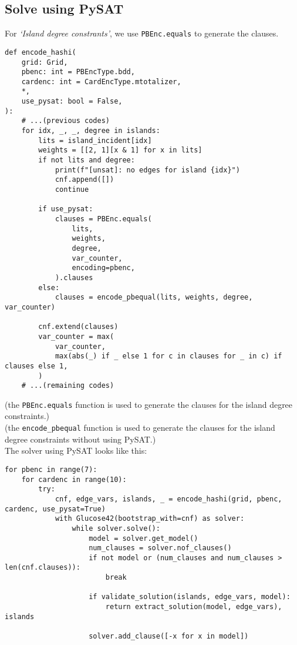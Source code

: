 \subsection{Solve using PySAT}
\begin{flushleft}
	For \textit{`Island degree constrants'}, we use \verb|PBEnc.equals| to generate the clauses.
	\begin{verbatim}
def encode_hashi(
    grid: Grid,
    pbenc: int = PBEncType.bdd,
    cardenc: int = CardEncType.mtotalizer,
    *,
    use_pysat: bool = False,
):
    # ...(previous codes)
    for idx, _, _, degree in islands:
        lits = island_incident[idx]
        weights = [[2, 1][x & 1] for x in lits]
        if not lits and degree:
            print(f"[unsat]: no edges for island {idx}")
            cnf.append([])
            continue

        if use_pysat:    
            clauses = PBEnc.equals(
                lits,
                weights,
                degree,
                var_counter,
                encoding=pbenc,
            ).clauses
        else:
            clauses = encode_pbequal(lits, weights, degree, var_counter)

        cnf.extend(clauses)
        var_counter = max(
            var_counter,
            max(abs(_) if _ else 1 for c in clauses for _ in c) if clauses else 1,
        )
    # ...(remaining codes)
\end{verbatim}
	(the \verb|PBEnc.equals| function is used to generate the clauses for the island degree constraints.)\\
	(the \verb|encode_pbequal| function is used to generate the clauses for the island degree constraints without using PySAT\@.)
	\\[2\baselineskip]
	The solver using PySAT looks like this:
	\begin{verbatim}
for pbenc in range(7):
    for cardenc in range(10):
        try:
            cnf, edge_vars, islands, _ = encode_hashi(grid, pbenc, cardenc, use_pysat=True)
            with Glucose42(bootstrap_with=cnf) as solver:
                while solver.solve():
                    model = solver.get_model()
                    num_clauses = solver.nof_clauses()
                    if not model or (num_clauses and num_clauses > len(cnf.clauses)):
                        break

                    if validate_solution(islands, edge_vars, model):
                        return extract_solution(model, edge_vars), islands

                    solver.add_clause([-x for x in model])
\end{verbatim}
\end{flushleft}
